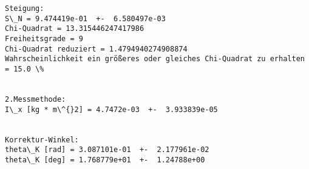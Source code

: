 \documentclass[10pt]{report}
\begin{document}
    \begin{Verbatim}[commandchars=\\\{\}, fontsize=\scriptsize]
Steigung: 
S\_N = 9.474419e-01  +-  6.580497e-03
Chi-Quadrat = 13.315446247417986
Freiheitsgrade = 9
Chi-Quadrat reduziert = 1.4794940274908874
Wahrscheinlichkeit ein größeres oder gleiches Chi-Quadrat zu erhalten = 15.0 \%


2.Messmethode: 
I\_x [kg * m\^{}2] = 4.7472e-03  +-  3.933839e-05


Korrektur-Winkel: 
theta\_K [rad] = 3.087101e-01  +-  2.177961e-02
theta\_K [deg] = 1.768779e+01  +-  1.24788e+00

    \end{Verbatim}

    \begin{center}
    \end{center}
    { \hspace*{\fill} \\}
    

    
    
    
    
\end{document}
